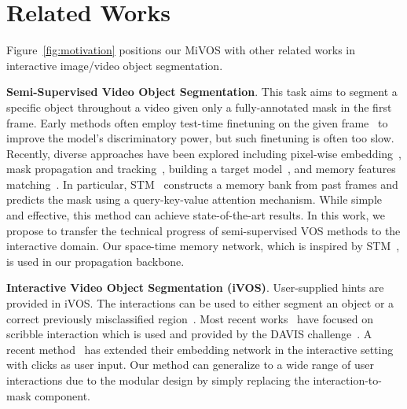 \documentclass[final]{cvpr}
\begin{document}
	\section{Related Works}
	
	Figure~\ref{fig:motivation} positions our MiVOS with other related works in interactive image/video object segmentation.
	
	\noindent\textbf{Semi-Supervised Video Object Segmentation}. 
	This task aims to segment a specific object throughout a video given only a fully-annotated mask in the first frame.
	Early methods often employ test-time finetuning on the given frame~\cite{luiten2018premvos, voigtlaender2017onlineOnAVOS, caelles2017oneOSVOS, khoreva2017lucid, perazzi2017learningMaskTrack, xu2019spatiotemporal} to improve the model's discriminatory power, but such finetuning is  often too slow. 
	Recently, diverse approaches have been explored including pixel-wise embedding~\cite{voigtlaender2019feelvos, chen2018blazinglyFast, yang2020collaborativeCFBI}, mask propagation and tracking~\cite{perazzi2017learningMaskTrack, hu2017maskrnn, ventura2019rvos, wang2019ranet, yang2018efficientModulation, oh2018fastRGMP, wang2019fastSiamMask, chen2020stateAwareTracker, cheng2018fastTrackingParts}, building a target model~\cite{robinson2020learningTargetModel}, and memory features matching~\cite{hu2018videomatch, oh2019videoSTM, li2020fastGlobalContext, miao2020memoryAggregationInteractive, huang2020fastTemporalAggregation, Wen2020DMVOS, Duarte2019Capsule}. 
	In particular, STM~\cite{oh2019videoSTM} constructs a memory bank from past frames and predicts the mask using a query-key-value attention mechanism. While simple and effective, this method can achieve state-of-the-art results.
	In this work, we propose to transfer the technical progress of semi-supervised VOS methods to the interactive domain. Our space-time memory network, which is inspired by STM~\cite{oh2019videoSTM}, is used in our propagation backbone.
	
	\noindent\textbf{Interactive Video Object Segmentation (iVOS)}.
	User-supplied hints are provided in iVOS. The interactions can be used to either segment an object or a correct previously misclassified region~\cite{wang2005interactiveVideoCutout, price2009livecut, shankar2015video, Caelles_arXiv_2018}. Most recent works~\cite{Yuk2020IVOSGlobalLocal, oh2019fastInteractive, miao2020memoryAggregationInteractive} have focused on scribble interaction which is used and provided by the DAVIS challenge~\cite{Caelles_arXiv_2019}.
	A recent method~\cite{chen2018blazinglyFast} has extended their embedding network in the interactive setting with clicks as user input.
	Our method can generalize to a wide range of user interactions due to the modular design by simply replacing the interaction-to-mask component.
	
\end{document}
